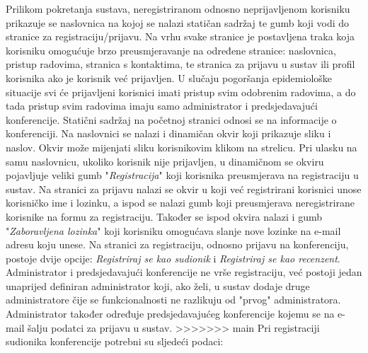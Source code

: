 		Prilikom pokretanja sustava, neregistriranom odnosno neprijavljenom korisniku prikazuje se naslovnica na kojoj se nalazi statičan sadržaj te gumb koji vodi do stranice za registraciju/prijavu. Na vrhu svake stranice  je postavljena traka koja korisniku omogućuje brzo preusmjeravanje na određene stranice: naslovnica, pristup radovima, stranica s kontaktima, te stranica za prijavu u sustav ili profil korisnika ako je korisnik već prijavljen. U slučaju pogoršanja epidemiološke situacije svi će prijavljeni korisnici imati pristup svim odobrenim radovima, a do tada pristup svim radovima imaju samo administrator i predsjedavajući konferencije. Statični sadržaj na početnoj stranici odnosi se na informacije o konferenciji. Na naslovnici se nalazi i dinamičan okvir koji prikazuje sliku i naslov. Okvir može mijenjati sliku korisnikovim klikom na strelicu. Pri ulasku na samu naslovnicu, ukoliko korisnik nije prijavljen, u dinamičnom se okviru pojavljuje veliki gumb "\textit{Registracija}" koji korisnika preusmjerava na registraciju u sustav. 
		\newline
		\newline
		Na stranici za prijavu nalazi se okvir u koji već registrirani korisnici unose korisničko ime i lozinku, a ispod se nalazi gumb koji preusmjerava neregistrirane korisnike na formu za registraciju. Također se ispod okvira nalazi i gumb "\textit{Zaboravljena lozinka}" koji korisniku omogućava slanje nove lozinke na e-mail adresu koju unese. Na stranici za registraciju, odnosno prijavu na konferenciju, postoje dvije opcije: \textit{Registriraj se kao sudionik} i \textit{Registriraj se kao recenzent}. Administrator i predsjedavajući konferencije ne vrše registraciju, već postoji jedan unaprijed definiran administrator koji, ako želi, u sustav dodaje druge administratore čije se funkcionalnosti ne razlikuju od "prvog" administratora. Administrator također određuje predsjedavajućeg konferencije kojemu se na e-mail šalju podatci za prijavu u sustav.
>>>>>>> main
		\newline
		\newline
		\indent Pri registraciji sudionika konferencije potrebni su sljedeći podaci:

